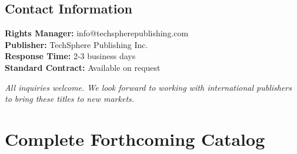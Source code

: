 \documentclass[11pt]{article}
\begin{document}
\subsection{Contact Information}
\textbf{Rights Manager:} info@techspherepublishing.com\\
\textbf{Publisher:} TechSphere Publishing Inc.\\
\textbf{Response Time:} 2-3 business days\\
\textbf{Standard Contract:} Available on request\\

\vspace{1cm}
\begin{center}
\textit{All inquiries welcome. We look forward to working with international publishers to bring these titles to new markets.}
\end{center}

\newpage

\appendix
\section{Complete Forthcoming Catalog}

\end{document}
